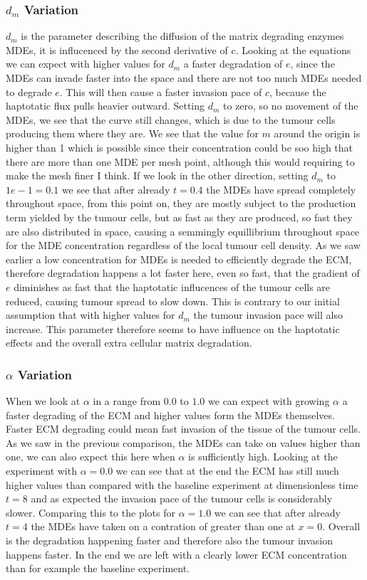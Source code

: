 \subsubsection*{$d_m$ Variation}

$d_m$ is the parameter describing the diffusion of the matrix degrading enzymes MDEs, it is influcenced by the second derivative of c. Looking at the equations we can expect with higher values for $d_m$ a faster degradation of $e$, since the MDEs can invade faster into the space and there are not too much MDEs needed to degrade $e$. This will then cause a faster invasion pace of $c$, because the haptotatic flux pulls heavier outward.
Setting $d_m$ to zero, so no movement of the MDEs, we see that the curve still changes, which is due to the tumour cells producing them where they are. We see that the value for $m$ around the origin is higher than 1 which is possible since their concentration could be soo high that there are more than one MDE per mesh point, although this would requiring to make the mesh finer I think. 
If we look in the other direction, setting $d_m$ to $1e-1=0.1$ we see that after already $t=0.4$ the MDEs have spread completely throughout space, from this point on, they are mostly subject to the production term yielded by the tumour cells, but as fast as they are produced, so fast they are also distributed in space, causing a semmingly equillibrium throughout space for the MDE concentration regardless of the local tumour cell density. As we saw earlier a low concentration for MDEs is needed to efficiently degrade the ECM, therefore degradation happens a lot faster here, even so fast, that the gradient of $e$ diminishes as fast that the haptotatic influcences of the tumour cells are reduced, causing tumour spread to slow down. This is contrary to our initial assumption that with higher values for $d_m$ the tumour invasion pace will also increase. This parameter therefore seems to have influence on the haptotatic effects and the overall extra cellular matrix degradation.
	

\subsubsection*{$\alpha$ Variation}

When we look at $\alpha$ in a range from $0.0$ to $1.0$ we can expect with growing $\alpha$ a faster degrading of the ECM and higher values form the MDEs themselves. Faster ECM degrading could mean fast invasion of the tissue of the tumour cells. As we saw in the previous comparison, the MDEs can take on values higher than one, we can also expect this here when $\alpha$ is sufficiently high. 
Looking at the experiment with $\alpha=0.0$ we can see that at the end the ECM has still much higher values than compared with the baseline experiment at dimensionless time $t=8$ and as expected the invasion pace of the tumour cells is considerably slower. 
Comparing this to the plots for $\alpha=1.0$ we can see that after already $t=4$ the MDEs have taken on a contration of greater than one at $x=0$. Overall is the degradation happening faster and therefore also the tumour invasion happens faster. In the end we are left with a clearly lower ECM concentration than for example the baseline experiment. 

